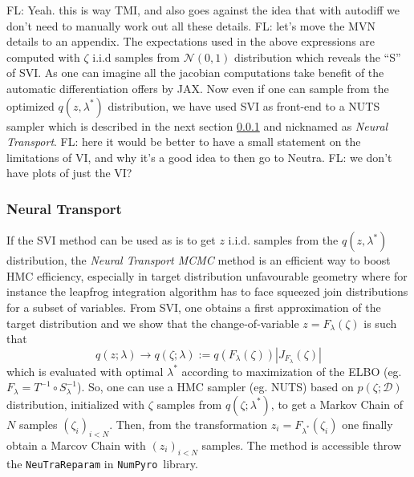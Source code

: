 \documentclass[twocolumn,twocolappendix,nofootinbib,iop]{openjournal}
\newcommand{\FrL}[1]{{\color{cyan}FL: #1}}
\newcommand{\numpyro}{\texttt{NumPyro}}
\newcommand{\bydef}{:=}
\begin{document}
\FrL{Yeah. this is way TMI, and also goes against the idea that with autodiff we don't need to manually work out all these details.} \FrL{let's move the MVN details to an appendix.}
The expectations used in the above expressions are computed with $\zeta$ i.i.d samples from $\mathcal{N}(0,1)$ distribution which reveals the ``S'' of SVI. As one can imagine all the jacobian computations take benefit of the automatic differentiation offers by JAX. Now even if one can sample from the optimized  $q(z,\lambda^\ast)$ distribution, we have used SVI as front-end to a NUTS sampler which is described in the next section \ref{sec-Neural-Reparametrisation} and nicknamed as \textit{Neural Transport}. \FrL{here it would be better to have a small statement on the limitations of VI, and why it's a good idea to then go to Neutra.} 
\FrL{we don't have plots of just the VI?}
%
\subsubsection{Neural Transport}
\label{sec-Neural-Reparametrisation}
%
If the SVI method can be used as is to get $z$ i.i.d. samples from the $q(z,\lambda^\ast)$ distribution, the \textit{Neural Transport MCMC} method \citep{2014arXiv1412.5492P,2019arXiv190303704H} is an efficient way to boost HMC efficiency, especially in target distribution unfavourable geometry where for instance the leapfrog integration algorithm has to face squeezed join distributions for a subset of variables. From SVI, one obtains a first approximation of the target distribution and we show that the change-of-variable $z=F_\lambda(\zeta)$ is such that
\begin{equation}
q(z;\lambda) \rightarrow q(\zeta;\lambda) \bydef q(F_\lambda(\zeta)) |J_{F_\lambda}(\zeta)|
\end{equation}
which is evaluated with optimal $\lambda^\ast$ according to maximization of the ELBO (eg. $F_\lambda=T^{-1}\circ S^{-1}_\lambda$). So, one can use a HMC sampler (eg. NUTS) based on $p(\zeta;\mathcal{D})$ distribution, initialized with $\zeta$ samples from $q(\zeta;\lambda^\ast)$, to get a Markov Chain of $N$ samples $(\zeta_i)_{i<N}$. Then, from the transformation  $z_i=F_{\lambda^\ast}(\zeta_i)$ one finally obtain a Marcov Chain with $(z_i)_{i<N}$ samples. The method is accessible throw the \verb|NeuTraReparam| in \numpyro\ library.

\end{document}
